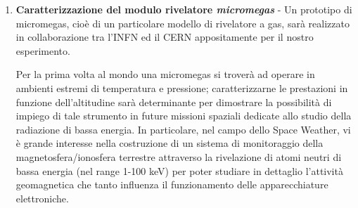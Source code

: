 \begin{enumerate}
\begin{figure}
    \label{Neutroni}
\end{figure}
    \item \textbf{Caratterizzazione del modulo rivelatore \emph{micromegas}} - Un prototipo di micromegas, cioè di un particolare modello di rivelatore a gas, sarà realizzato in collaborazione tra l'INFN ed il CERN appositamente per il nostro esperimento.

Per la prima volta al mondo una micromegas si troverà ad operare in ambienti estremi di temperatura e pressione; caratterizzarne le prestazioni in funzione dell'altitudine sarà determinante per dimostrare la possibilità di impiego di tale strumento in future missioni spaziali dedicate allo studio della radiazione di bassa energia. In particolare, nel campo dello Space Weather, vi è grande interesse nella costruzione di un sistema di monitoraggio della magnetosfera/ionosfera terrestre attraverso la rivelazione di atomi neutri di bassa energia (nel range 1-100 keV) per poter studiare in dettaglio l’attività geomagnetica che tanto influenza il funzionamento delle apparecchiature elettroniche.
\end{enumerate}


